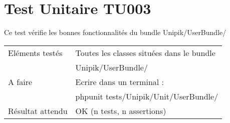 \section{Test Unitaire TU003}
	
	Ce test vérifie les bonnes fonctionnalités du bundle Unipik/UserBundle/ \\
				
  	\begin{center}
  		\begin{tabular}[h]{|p{}|p{}|}
		\hline
			Eléments testés & Toutes les classes situées dans le bundle \\ 																& Unipik/UserBundle/ \\\hline
    			A faire & Ecrire dans un terminal : \\ 
    					& phpunit tests/Unipik/Unit/UserBundle/\\\hline
    			Résultat attendu & OK (n tests, n assertions) \\\hline
     	\end{tabular}
  	\end{center}	 	
